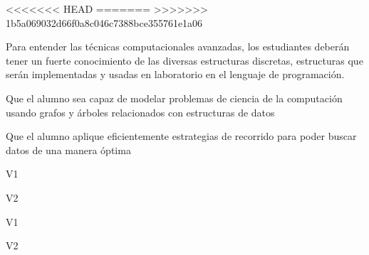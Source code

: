 \begin{syllabus}

<<<<<<< HEAD
=======
>>>>>>> 1b5a069032d66f0a8c046c7388bce355761e1a06

\begin{justification}
Para entender las técnicas computacionales avanzadas, los estudiantes deberán tener un fuerte conocimiento de las
diversas estructuras discretas, estructuras que serán implementadas y usadas en laboratorio en el lenguaje de programación.
\end{justification}

\begin{goals}
\item Que el alumno sea capaz de modelar problemas de ciencia de la computación usando grafos y árboles relacionados con estructuras de datos
\item Que el alumno aplique eficientemente estrategias de recorrido para poder buscar datos de una manera óptima
\end{goals}

\begin{outcomes}{V1}
    \item {}
    \item {}	
    \item {}
\end{outcomes}

\begin{outcomes}{V2}
    \item {}
    \item {}	
    \item {}
\end{outcomes}

\begin{competences}{V1}
    \item {}
    \item {}
    \item {}
\end{competences}

\begin{competences}{V2}
    \item {}
    \item {}
    \item {}
\end{competences}


\end{syllabus}
